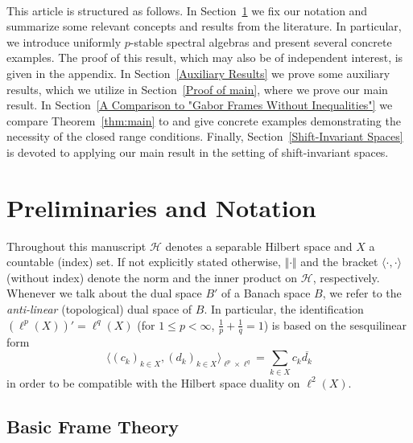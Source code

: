 \documentclass{amsart}
\def\Hil{\mathcal{H}}
\begin{document}
\

This article is structured as follows. In Section~\ref{Preliminaries and Notation} we fix our notation and summarize some relevant concepts and results from the literature. In particular, we introduce uniformly $p$-stable spectral algebras and present several concrete examples. The proof of this result, which may also be of independent interest, is given in the appendix. In Section~\ref{Auxiliary Results} we prove some auxiliary results, which we utilize in Section~\ref{Proof of main}, where we prove our main result. In Section~\ref{A Comparison to "Gabor Frames Without Inequalities"} we compare Theorem~\ref{thm:main} to \cite[Theorem~3.1]{gro07ineq} and give concrete examples demonstrating the necessity of the closed range conditions. Finally, Section~\ref{Shift-Invariant Spaces} is devoted to applying our main result in the setting of shift-invariant spaces.


\section{Preliminaries and Notation}\label{Preliminaries and Notation}

Throughout this manuscript $\Hil$ denotes a separable Hilbert space and $X$ a countable (index) set. If not explicitly stated otherwise, $\Vert \cdot \Vert$ and the bracket $\langle \cdot,\cdot\rangle$ (without index) denote the norm and the inner product on $\Hil$, respectively. Whenever we talk about the dual space $B'$ of a Banach space $B$, we refer to the \emph{anti-linear} (topological) dual space of $B$. In particular, the identification $(\ell^p(X))' = \ell^q(X)$ (for $1\leq p < \infty$, $\frac{1}{p}+\frac{1}{q} = 1$) is based on the sesquilinear form 
$$\big\langle (c_k)_{k\in X}, (d_k)_{k\in X}\big\rangle_{\ell^p\times \ell^q} = \sum_{k\in X}c_k \overline{d_k}$$
in order to be compatible with the Hilbert space duality on $\ell^2(X)$.

\subsection{Basic Frame Theory}\label{Basic Frame Theory}
\end{document}
